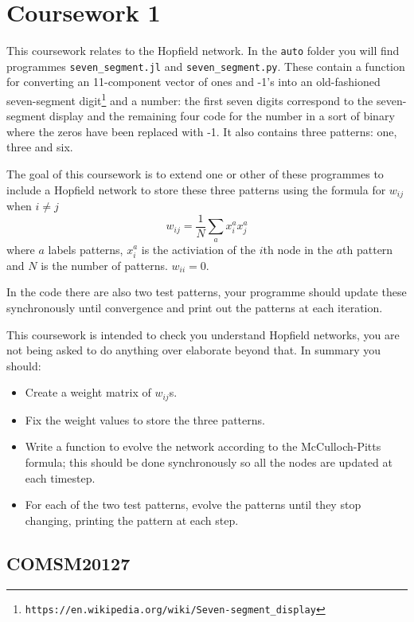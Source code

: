 \documentclass[12pt]{article}
\begin{document}
\section*{Coursework 1}

This coursework relates to the Hopfield network. In the \texttt{auto}
folder you will find programmes \texttt{seven\_segment.jl} and
\texttt{seven\_segment.py}. These contain a function for converting an
11-component vector of ones and -1's into an old-fashioned
seven-segment digit\footnote{\texttt{https://en.wikipedia.org/wiki/Seven-segment\_display}} and a number: the first seven digits correspond to
the seven-segment display and the remaining four code for the number
in a sort of binary where the zeros have been replaced with -1. It
also contains three patterns: one, three and six.

The goal of this coursework is to extend one or other of these
programmes to include a Hopfield network to store these three
patterns using the formula for $w_{ij}$ when $i\not=j$
\begin{equation}
w_{ij}=\frac{1}{N}\sum_a x_i^a x_j^a
\end{equation}
where $a$ labels patterns, $x_i^a$ is the activiation of the $i$th
node in the $a$th pattern and $N$ is the number of
patterns. $w_{ii}=0$.

In the code there are also two test patterns, your programme should
update these synchronously until convergence and print out the
patterns at each iteration. 


This coursework is intended to check you understand Hopfield networks,
you are not being asked to do anything over elaborate beyond that. In
summary you should:
\begin{itemize}
\item Create a weight matrix of $w_{ij}$s.
\item Fix the weight values to store the three patterns.
\item Write a function to evolve the network according to the
  McCulloch-Pitts formula; this should be done synchronously so all the nodes are updated at each timestep.
\item For each of the two test patterns, evolve the patterns until they stop changing, printing the pattern at each step.
\end{itemize}




\subsection*{COMSM20127}
\end{document}
